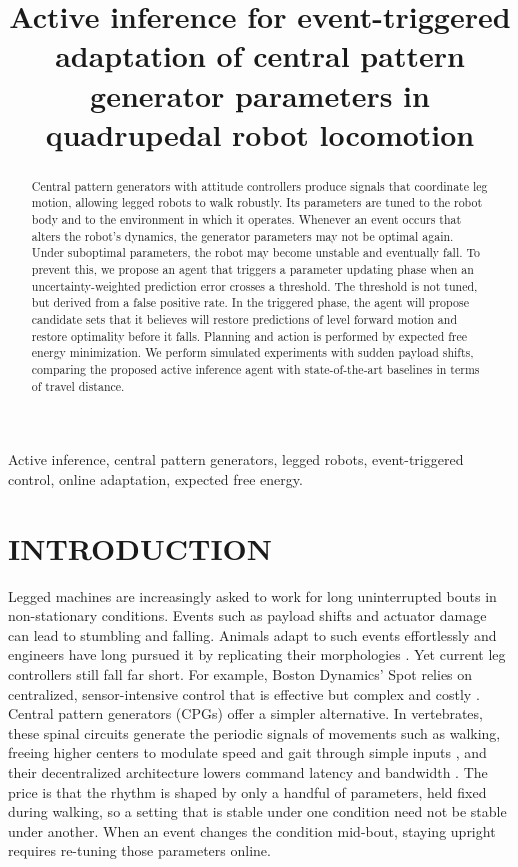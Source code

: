\documentclass[lettersize,journal]{IEEEtran}
\title{
Active inference for event-triggered adaptation of central pattern generator parameters in quadrupedal robot locomotion
}
\begin{document}
\maketitle

\begin{abstract}
Central pattern generators with attitude controllers produce signals that coordinate leg motion, allowing legged robots to walk robustly. Its parameters are tuned to the robot body and to the environment in which it operates. Whenever an event occurs that alters the robot's dynamics, the generator parameters may not be optimal again. Under suboptimal parameters, the robot may become unstable and eventually fall. To prevent this, we propose an agent that triggers a parameter updating phase when an uncertainty-weighted prediction error crosses a threshold. The threshold is not tuned, but derived from a false positive rate. In the triggered phase, the agent will propose candidate sets that it believes will restore predictions of level forward motion and restore optimality before it falls. Planning and action is performed by expected free energy minimization. We perform simulated experiments with sudden payload shifts, comparing the proposed active inference agent with state-of-the-art baselines in terms of travel distance. 
\end{abstract}

\begin{IEEEkeywords}
Active inference, central pattern generators, legged robots, event-triggered control, online adaptation, expected free energy.
\end{IEEEkeywords}

\section{INTRODUCTION}
\label{sec:introduction}

Legged machines are increasingly asked to work for long uninterrupted bouts in non-stationary conditions. Events such as payload shifts and actuator damage can lead to stumbling and falling.
Animals adapt to such events effortlessly and engineers have long pursued it by replicating their morphologies \cite{pettersen2017snake, dwivedula2025configbot}. Yet current leg controllers still fall far short. For example, Boston Dynamics' Spot relies on centralized, sensor-intensive control that is effective but complex and costly \cite{dwivedula2025configbot}.
Central pattern generators (CPGs) offer a simpler alternative.
In vertebrates, these spinal circuits generate the periodic signals of movements such as walking, freeing higher centers to modulate speed and gait through simple inputs \cite{goulding2009circuits, dickinson2000how}, and their decentralized architecture lowers command latency and bandwidth \cite{ijspeert2008special}.
The price is that the rhythm is shaped by only a handful of parameters, held fixed during walking, so a setting that is stable under one condition need not be stable under another.
When an event changes the condition mid-bout, staying upright requires re-tuning those parameters online.
\end{document}
